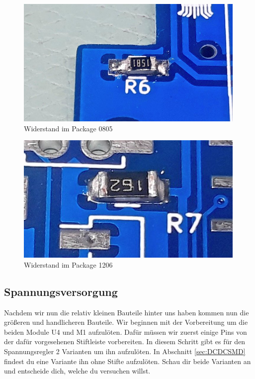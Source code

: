 \documentclass[12pt, a4paper]{article}		%
\begin{document}
\begin{minipage}[t]{0.49\textwidth}
\begin{figure}[H]
	\centering
		\includegraphics[width=0.99\textwidth]{Grafiken/IMG_-vz92y3.jpg}
	\caption{Widerstand im Package 0805}
	\label{fig:R0805}
\end{figure}
\end{minipage}
\begin{minipage}[t]{0.49\textwidth}
\begin{figure}[H]
	\centering
		\includegraphics[width=0.99\textwidth]{Grafiken/IMG_l2oi9e.jpg}
	\caption{Widerstand im Package 1206}
	\label{fig:R1206}
\end{figure}
\end{minipage}

\subsection{Spannungsversorgung}

Nachdem wir nun die relativ kleinen Bauteile hinter uns haben kommen nun die größeren und handlicheren Bauteile. Wir beginnen mit der Vorbereitung um die beiden Module U4 und M1 aufzulöten. Dafür müssen wir zuerst einige Pins von der dafür vorgesehenen Stiftleiste vorbereiten. In diesem Schritt gibt es für den Spannungsregler 2 Varianten um ihn aufzulöten. In Abschnitt \ref{sec:DCDCSMD} findest du eine Variante ihn ohne Stifte aufzulöten. Schau dir beide Varianten an und entscheide dich, welche du versuchen willst.\\ \newline
\end{document}
